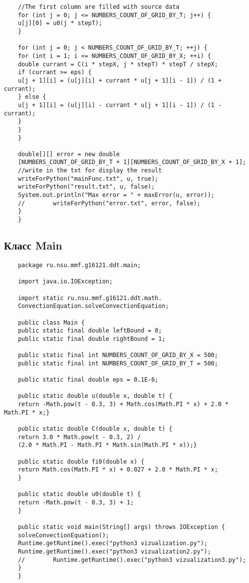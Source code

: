 \begin{verbatim}
	//The first column are filled with source data
	for (int j = 0; j <= NUMBERS_COUNT_OF_GRID_BY_T; j++) {
	u[j][0] = u0(j * stepT);
	}
	
	for (int j = 0; j < NUMBERS_COUNT_OF_GRID_BY_T; ++j) {
	for (int i = 1; i <= NUMBERS_COUNT_OF_GRID_BY_X; ++i) {
	double currant = C(i * stepX, j * stepT) * stepT / stepX;
	if (currant >= eps) {
	u[j + 1][i] = (u[j][i] + currant * u[j + 1][i - 1]) / (1 + currant);
	} else {
	u[j + 1][i] = (u[j][i] - currant * u[j + 1][i - 1]) / (1 - currant);
	}
	}
	}
	
	double[][] error = new double
	[NUMBERS_COUNT_OF_GRID_BY_T + 1][NUMBERS_COUNT_OF_GRID_BY_X + 1];
	//write in the txt for display the result
	writeForPython("mainFunc.txt", u, true);
	writeForPython("result.txt", u, false);
	System.out.println("Max error = " + maxError(u, error));
	//        writeForPython("error.txt", error, false);
	}
	}
	\end{verbatim}
	\subsection{Класс Main}
	\begin{verbatim}
	package ru.nsu.mmf.g16121.ddt.main;
	
	import java.io.IOException;
	
	import static ru.nsu.mmf.g16121.ddt.math.
	ConvectionEquation.solveConvectionEquation;
	
	public class Main {
	public static final double leftBound = 0;
	public static final double rightBound = 1;
	
	public static final int NUMBERS_COUNT_OF_GRID_BY_X = 500;
	public static final int NUMBERS_COUNT_OF_GRID_BY_T = 500;
	
	public static final double eps = 0.1E-6;
	
	public static double u(double x, double t) {
	return -Math.pow(t - 0.3, 3) + Math.cos(Math.PI * x) + 2.0 * Math.PI * x;}
	
	public static double C(double x, double t) {
	return 3.0 * Math.pow(t - 0.3, 2) /
	(2.0 * Math.PI - Math.PI * Math.sin(Math.PI * x));}
	
	public static double fi0(double x) {
	return Math.cos(Math.PI * x) + 0.027 + 2.0 * Math.PI * x;
	}
	
	public static double u0(double t) {
	return -Math.pow(t - 0.3, 3) + 1;
	}
	
	public static void main(String[] args) throws IOException {
	solveConvectionEquation();
	Runtime.getRuntime().exec("python3 vizualization.py");
	Runtime.getRuntime().exec("python3 vizualization2.py");
	//        Runtime.getRuntime().exec("python3 vizualization3.py");
	}
	}
	\end{verbatim}